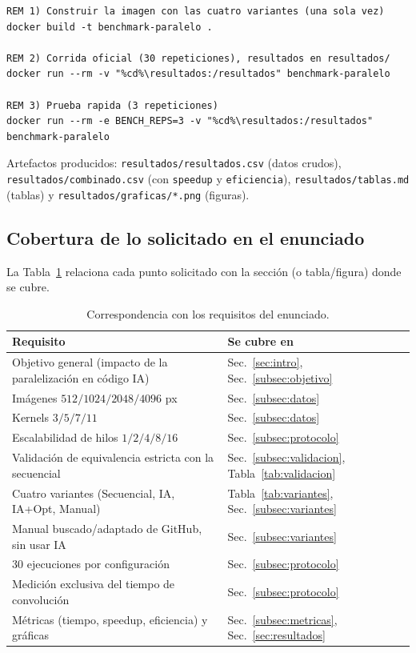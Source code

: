 \documentclass[12pt]{article}
\begin{document}
\begin{lstlisting}
REM 1) Construir la imagen con las cuatro variantes (una sola vez)
docker build -t benchmark-paralelo .

REM 2) Corrida oficial (30 repeticiones), resultados en resultados/
docker run --rm -v "%cd%\resultados:/resultados" benchmark-paralelo

REM 3) Prueba rapida (3 repeticiones)
docker run --rm -e BENCH_REPS=3 -v "%cd%\resultados:/resultados" benchmark-paralelo
\end{lstlisting}

Artefactos producidos: \texttt{resultados/resultados.csv} (datos crudos),
\texttt{resultados/combinado.csv} (con \texttt{speedup} y \texttt{eficiencia}),
\texttt{resultados/tablas.md} (tablas) y \texttt{resultados/graficas/*.png}
(figuras).

\subsection{Cobertura de lo solicitado en el enunciado}
La Tabla~\ref{tab:cobertura} relaciona cada punto solicitado con la sección (o
tabla/figura) donde se cubre.

\begin{table}[H]
\centering
\caption{Correspondencia con los requisitos del enunciado.}
\label{tab:cobertura}
\small
\begin{tabularx}{\linewidth}{@{}X l@{}}
\toprule
\textbf{Requisito} & \textbf{Se cubre en} \\
\midrule
Objetivo general (impacto de la paralelización en código IA) & Sec.~\ref{sec:intro}, Sec.~\ref{subsec:objetivo} \\
Imágenes $512/1024/2048/4096$ px & Sec.~\ref{subsec:datos} \\
Kernels $3/5/7/11$ & Sec.~\ref{subsec:datos} \\
Escalabilidad de hilos $1/2/4/8/16$ & Sec.~\ref{subsec:protocolo} \\
Validación de equivalencia estricta con la secuencial & Sec.~\ref{subsec:validacion}, Tabla~\ref{tab:validacion} \\
Cuatro variantes (Secuencial, IA, IA+Opt, Manual) & Tabla~\ref{tab:variantes}, Sec.~\ref{subsec:variantes} \\
Manual buscado/adaptado de GitHub, sin usar IA & Sec.~\ref{subsec:variantes} \\
30 ejecuciones por configuración & Sec.~\ref{subsec:protocolo} \\
Medición exclusiva del tiempo de convolución & Sec.~\ref{subsec:protocolo} \\
Métricas (tiempo, speedup, eficiencia) y gráficas & Sec.~\ref{subsec:metricas}, Sec.~\ref{sec:resultados} \\
\bottomrule
\end{tabularx}
\end{table}
\end{document}
